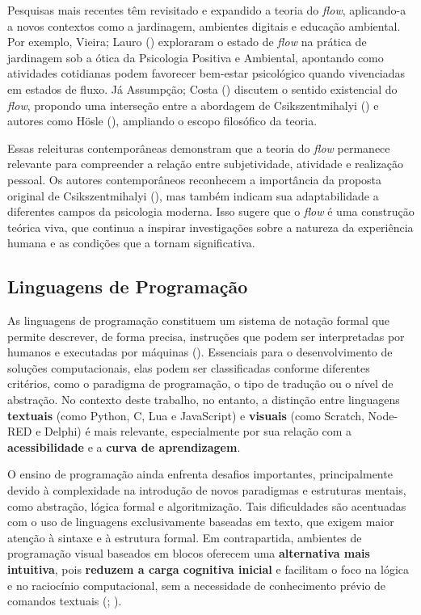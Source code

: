 \documentclass[
  12pt,
  a4paper,
]{article}
\begin{document}
Pesquisas mais recentes têm revisitado e expandido a teoria do
\emph{flow}, aplicando-a a novos contextos como a jardinagem, ambientes
digitais e educação ambiental. Por exemplo, Vieira; Lauro
() exploraram o estado de \emph{flow} na
prática de jardinagem sob a ótica da Psicologia Positiva e Ambiental,
apontando como atividades cotidianas podem favorecer bem-estar
psicológico quando vivenciadas em estados de fluxo. Já Assumpção; Costa
() discutem o sentido existencial do
\emph{flow}, propondo uma interseção entre a abordagem de
Csikszentmihalyi () e autores
como Hösle (), ampliando o escopo
filosófico da teoria.

Essas releituras contemporâneas demonstram que a teoria do \emph{flow}
permanece relevante para compreender a relação entre subjetividade,
atividade e realização pessoal. Os autores contemporâneos reconhecem a
importância da proposta original de Csikszentmihalyi
(), mas também indicam sua
adaptabilidade a diferentes campos da psicologia moderna. Isso sugere
que o \emph{flow} é uma construção teórica viva, que continua a inspirar
investigações sobre a natureza da experiência humana e as condições que
a tornam significativa.

\subsection{Linguagens de
Programação}\label{linguagens-de-programauxe7uxe3o}

As linguagens de programação constituem um sistema de notação formal que
permite descrever, de forma precisa, instruções que podem ser
interpretadas por humanos e executadas por máquinas
(). Essenciais para o
desenvolvimento de soluções computacionais, elas podem ser classificadas
conforme diferentes critérios, como o paradigma de programação, o tipo
de tradução ou o nível de abstração. No contexto deste trabalho, no
entanto, a distinção entre linguagens \textbf{textuais} (como Python, C,
Lua e JavaScript) e \textbf{visuais} (como Scratch, Node-RED e Delphi) é
mais relevante, especialmente por sua relação com a
\textbf{acessibilidade} e a \textbf{curva de aprendizagem}.

O ensino de programação ainda enfrenta desafios importantes,
principalmente devido à complexidade na introdução de novos paradigmas e
estruturas mentais, como abstração, lógica formal e algoritmização. Tais
dificuldades são acentuadas com o uso de linguagens exclusivamente
baseadas em texto, que exigem maior atenção à sintaxe e à estrutura
formal. Em contrapartida, ambientes de programação visual baseados em
blocos oferecem uma \textbf{alternativa mais intuitiva}, pois
\textbf{reduzem a carga cognitiva inicial} e facilitam o foco na lógica
e no raciocínio computacional, sem a necessidade de conhecimento prévio
de comandos textuais (;
).
\end{document}
